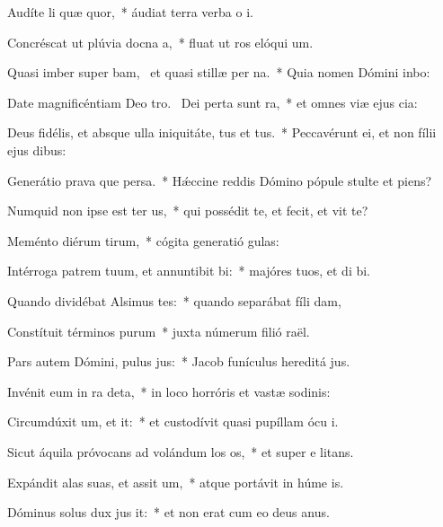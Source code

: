\item Audíte li quæ quor,~* áudiat terra verba o i.
\item Concréscat ut plúvia docna a,~* fluat ut ros elóqui um.
\item Quasi imber super bam,~\pscross{} et quasi stillæ per na.~* Quia nomen Dómini inbo:
\item Date magnificéntiam Deo tro.~\pscross{} Dei perta sunt ra,~* et omnes viæ ejus cia:
\item Deus fidélis, et absque ulla iniquitáte, tus et tus.~* Peccavérunt ei, et non fílii ejus  dibus:
\item Generátio prava que persa.~* Hǽccine reddis Dómino pópule stulte et piens?
\item Numquid non ipse est ter us,~* qui possédit te, et fecit, et vit te?
\item Meménto diérum tirum,~* cógita generatió gulas:
\item Intérroga patrem tuum, et annuntibit bi:~* majóres tuos, et di bi.
\item Quando dividébat Alsimus tes:~* quando separábat fíli dam,
\item Constítuit términos purum~* juxta númerum filió raël.
\item Pars autem Dómini, pulus jus:~* Jacob funículus hereditá jus.
\item Invénit eum in ra deta,~* in loco horróris et vastæ sodinis:
\item Circumdúxit um, et it:~* et custodívit quasi pupíllam ócu i.
\item Sicut áquila próvocans ad volándum los os,~* et super e litans.
\item Expándit alas suas, et assit um,~* atque portávit in húme is.
\item Dóminus solus dux jus it:~* et non erat cum eo deus anus.
